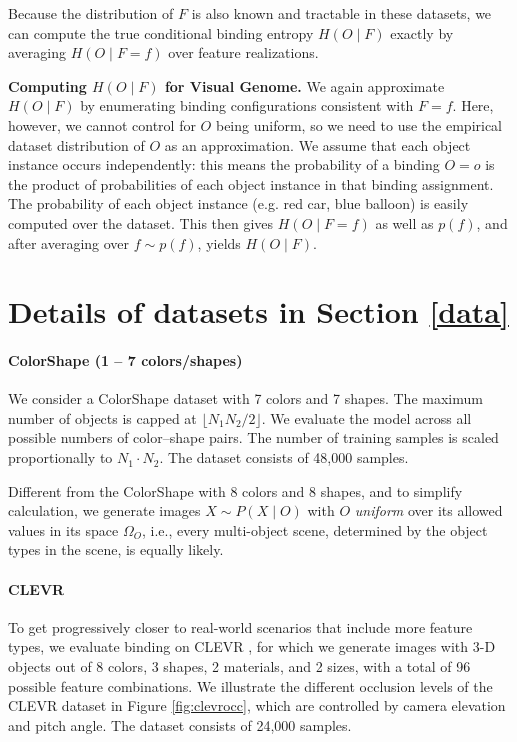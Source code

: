 \documentclass{article}
\theoremstyle{plain}
\theoremstyle{definition}
\theoremstyle{remark}
\begin{document}
Because the distribution of $F$ is also known and tractable in these datasets, we can compute the true conditional binding entropy $H(O\mid F)$ exactly by averaging $H(O\mid F=f)$ over feature realizations.



\textbf{Computing $H(O\mid F)$ for Visual Genome.} We again approximate $H(O \mid F)$ by enumerating binding configurations consistent with $F=f$. Here, however, we cannot control for $O$ being uniform, so we need to use the empirical dataset distribution of $O$ as an approximation. We assume that each object instance occurs independently: this means the probability of a binding $O=o$ is the product of probabilities of each object instance in that binding assignment. The probability of each object instance (e.g. red car, blue balloon) is easily computed over the dataset. This then gives $H(O\mid F=f)$ as well as $p(f)$, and after averaging over $f\sim p(f)$, yields $H(O\mid F)$.




\section{Details of datasets in Section \ref{data}}
\label{ap:datasets}
\paragraph{ColorShape (1 -- 7 colors/shapes)}
We consider a ColorShape dataset with 7 colors and 7 shapes. The maximum number of objects is capped at $\lfloor N_1 N_2 / 2 \rfloor$. We evaluate the model across all possible numbers of color–shape pairs. The number of training samples is scaled proportionally to $N_1 \cdot N_2$. The dataset consists of 48,000 samples.

Different from the ColorShape with 8 colors and 8 shapes, and to simplify calculation, we generate images $X \sim P(X \mid O)$ with $O$ \emph{uniform} over its allowed values in its space $\Omega_O$, i.e., every multi-object scene, determined by the object types in the scene, is equally likely. 

\paragraph{CLEVR} To get progressively closer to real-world scenarios that include more feature types, we evaluate binding on CLEVR \cite{johnson2016clevrdiagnosticdatasetcompositional}, for which we generate images with 3-D objects out of 8 colors, 3 shapes, 2 materials, and 2 sizes, with a total of 96 possible feature combinations. We illustrate the different occlusion levels of the CLEVR dataset in Figure \ref{fig:clevrocc}, which are controlled by camera elevation and pitch angle. The dataset consists of 24,000 samples.
\end{document}
